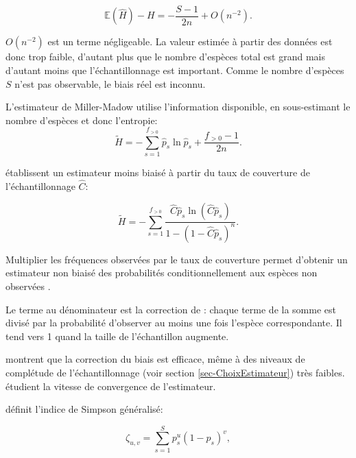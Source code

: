 \documentclass[
  11pt,
  american,
  a4paper,
  extrafontsizes,onecolumn,openright
  ]{memoir}
\begin{document}
\begin{equation}
  \label{eq:Basharin1959}
  \mathbb{E}\left( \hat{H} \right) - H 
  = -\frac{S - 1}{2n} + O\left(n^{-2}\right).
\end{equation}

\(O(n^{-2})\) est un terme négligeable.
La valeur estimée à partir des données est donc trop faible, d'autant plus que le nombre d'espèces total est grand mais d'autant moins que l'échantillonnage est important.
Comme le nombre d'espèces \(S\) n'est pas observable, le biais réel est inconnu.

L'estimateur de Miller-Madow \autocite{Miller1955} utilise l'information disponible, en sous-estimant le nombre d'espèces et donc l'entropie:
\begin{equation}
  \label{eq:MillerMadow}
  \tilde{H} = -\sum^{f_{>0}}_{s=1}{\hat{p}_s \ln{\hat{p}_s}} + \frac{f_{>0} - 1}{2n}.
\end{equation}

\textcite{Chao2003} établissent un estimateur moins biaisé à partir du taux de couverture de l'échantillonnage \(\hat{C}\):

\begin{equation}
  \label{eq:ChaoShen}
  \tilde{H} 
  = -\sum_{s=1}^{f_{>0}}{\frac
    {\hat{C} \hat{p}_s \ln\left( \hat{C} \hat{p}_s \right)}
    {1 - \left( 1 - \hat{C}\hat{p}_s \right)^n}}.
\end{equation}

Multiplier les fréquences observées par le taux de couverture permet d'obtenir un estimateur non biaisé des probabilités conditionnellement aux espèces non observées \autocite{Ashbridge2000}.

Le terme au dénominateur est la correction de \textcite{Horvitz1952}: chaque terme de la somme est divisé par la probabilité d'observer au moins une fois l'espèce correspondante.
Il tend vers 1 quand la taille de l'échantillon augmente.

\textcite{Beck2010} montrent que la correction du biais est efficace, même à des niveaux de complétude de l'échantillonnage (voir section \ref{sec-ChoixEstimateur}) très faibles. \textcite{Vu2007} étudient la vitesse de convergence de l'estimateur.

\textcite{Zhang2012} définit l'indice de Simpson généralisé:

\begin{equation}
  \label{eq:zeta}
  \zeta_{u,v} = \sum^S_{s=1}{p^u_s{\left( 1 - p_s \right)}^v},
\end{equation}
\end{document}
